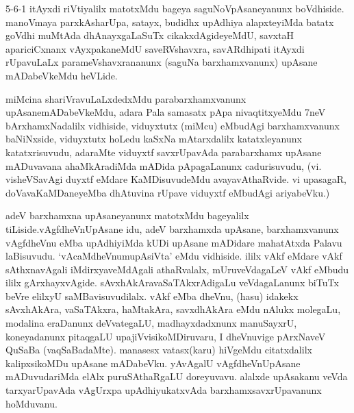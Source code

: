 
\begin{artha}
5-6-1 itAyxdi riVtiyalilx matotxMdu bageya saguNoVpAsaneyanunx boVdhiside. manoVmaya parxkAsharUpa, satayx, budidhx upAdhiya alapxteyiMda batatx goVdhi muMtAda dhAnayxgaLaSuTx cikakxdAgideyeMdU, savxtaH apariciCxnanx vAyxpakaneMdU saveRVshavxra, savARdhipati itAyxdi rUpavuLaLx parameVshavxrananunx (saguNa barxhamxvanunx) upAsane mADabeVkeMdu heVLide.
\end{artha}


\begin{artha}
miMcina shariVravuLaLxdedxMdu parabarxhamxvanunx upAsanemADabeVkeMdu, adara Pala samasatx pApa nivaqtitxyeMdu 7neV bArxhamxNadalilx vidhiside, viduyxtutx (miMcu) eMbudAgi barxhamxvanunx baNiNxside, viduyxtutx hoLedu kaSxNa mAtarxdalilx katatxleyanunx katatxrisuvudu, adaraMte viduyxtf savxrUpavAda parabarxhamx upAsane mADuvavana ahaMkAradiMda mADida pApagaLanunx cadurisuvudu, (vi. visheVSavAgi duyxtf eMdare KaMDisuvudeMdu avayavAthaRvide. vi upasagaR, doVavaKaMDaneyeMba dhAtuvina rUpave viduyxtf eMbudAgi ariyabeVku.)
\end{artha}


\begin{artha}
adeV barxhamxna upAsaneyanunx matotxMdu bageyalilx tiLiside.\break vAgfdheVnUpAsane idu, adeV barxhamxda upAsane, barxhamxvanunx vAgfdheVnu eMba upAdhiyiMda kUDi upAsane mADidare mahatAtxda Palavu laBisuvudu. `vAcaMdheVnumupAsiVta' eMdu vidhiside. ililx vAkf eMdare vAkf sAthxnavAgali iMdirxyaveMdAgali athaRvalalx, mUruveVdagaLeV vAkf eMbudu ililx gArxhayxvAgide. sAvxhAkAravaSaTAkxrAdigaLu veVdagaLanunx biTuTx beVre elilxyU saMBavisuvudilalx. vAkf eMba dheVnu, (hasu) idakekx sAvxhAkAra, vaSaTAkxra, haMtakAra, savxdhAkAra eMdu nAlukx molegaLu, modalina eraDanunx deVvategaLU, madhayxdadxnunx manuSayxrU, koneyadanunx pitaqgaLU upajiVvisikoMDiruvaru, I dheVnuvige pArxNaveV QuSaBa (vaqSaBadaMte). manasesx vatasx(karu) hiVgeMdu citatxdalilx kalipxsikoMDu upAsane mADabeVku. yAvAgalU vAgfdheVnUpAsane mADuvudariMda elAlx puruSAthaRgaLU doreyuvavu. alalxde upAsakanu veVda tarxyarUpavAda vAgUrxpa upAdhiyukatxvAda barxhamxsavxrUpavanunx hoMduvanu.
\end{artha}


